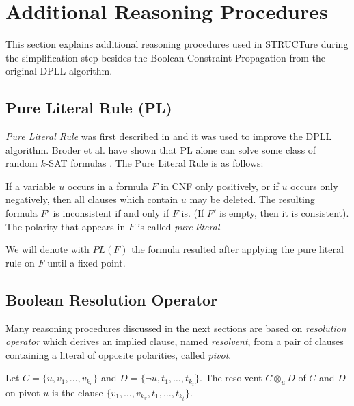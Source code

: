 \section{Additional Reasoning Procedures}

This section explains additional reasoning procedures used in
STRUCTure during the simplification step besides the Boolean
Constraint Propagation from the original DPLL algorithm.

\subsection{Pure Literal Rule (PL)}
\label{ssec:pl}

\emph{Pure Literal Rule} was first described in
\cite{Davis:1962:MPT:368273.368557} and it was used to
improve the DPLL algorithm. Broder et al. have shown that
PL alone can solve some class of random $k$-SAT formulas
\cite{Broder:1993:SMS:313559.313794}.  The Pure Literal Rule is
as follows:

\begin{mydef}
  If a variable $u$ occurs in a formula $F$ in CNF only positively, or
  if $u$ occurs only negatively, then all clauses which contain $u$
  may be deleted. The resulting formula $F'$ is inconsistent
  if and only if $F$ is. (If $F'$ is empty, then it is consistent).
  The polarity that appears in $F$ is called \emph{pure literal}.
\end{mydef}

We will denote with $PL(F)$ the formula resulted after applying
the pure literal rule on $F$ until a fixed point.


\subsection{Boolean Resolution Operator}
\label{ssec:resolution}

Many reasoning procedures discussed in the next sections are based
on \emph{resolution operator} \cite{Robinson:1965:MLB:321250.321253}
which derives an implied clause, named \emph{resolvent}, from
a pair of clauses containing a literal of opposite polarities,
called \emph{pivot}.

\begin{mydef}
  \label{mydef:resolution}
  Let $C = \{ u, v_1, \ldots, v_{k_v} \}$ and $D = \{ \neg u,
  t_1, \ldots, t_{k_t} \}$. The resolvent $C \otimes_{u} D$ of $C$
  and $D$ on pivot $u$ is the clause $\{v_1, \ldots, v_{k_v}, t_1,
  \ldots, t_{k_t}\}$.
\end{mydef}

